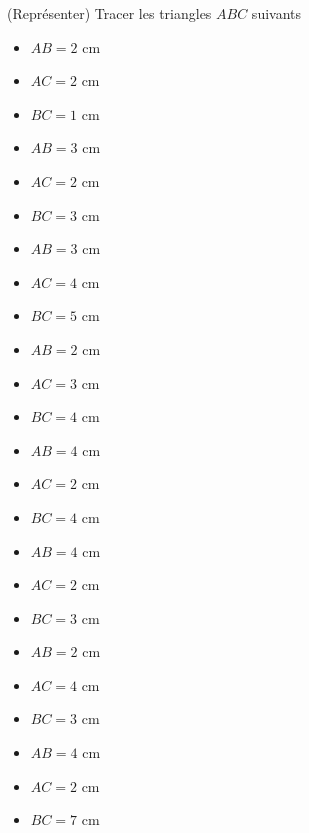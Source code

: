  (Représenter) Tracer les triangles $ABC$ suivants

\begin{multicols}{4}
\begin{itemize}
\item $AB=2$ cm
\item $AC=2$ cm
\item $BC=1$ cm
\end{itemize}

\begin{itemize}
\item $AB=3$ cm
\item $AC=2$ cm
\item $BC=3$ cm
\end{itemize}\columnbreak

\begin{itemize}
\item $AB=3$ cm
\item $AC=4$ cm
\item $BC=5$ cm
\end{itemize}

\begin{itemize}
\item $AB=2$ cm
\item $AC=3$ cm
\item $BC=4$ cm
\end{itemize}

\begin{itemize}
\item $AB=4$ cm
\item $AC=2$ cm
\item $BC=4$ cm
\end{itemize}

\begin{itemize}
\item $AB=4$ cm
\item $AC=2$ cm
\item $BC=3$ cm
\end{itemize}

\begin{itemize}
\item $AB=2$ cm
\item $AC=4$ cm
\item $BC=3$ cm
\end{itemize}

\begin{itemize}
\item $AB=4$ cm
\item $AC=2$ cm
\item $BC=7$ cm
\end{itemize}

\end{multicols}